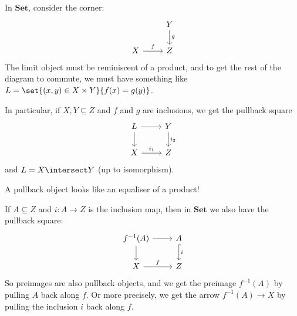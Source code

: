 \documentclass[article, a4paper, 11pt, oneside]{memoir}
\numberwithin{equation}{chapter}
\newcommand{\ncat}[1]{\mathbf{#1}} %
\newcommand{\catSet}{\ncat{Set}}
\theoremstyle{myexample}
\theoremstyle{myexamplebreak}
\begin{document}
\begin{examplebreak}
    \begin{enumexample}
        \item In $\catSet$, consider the corner:
        \begin{equation*}
            \begin{tikzcd}
                & Y
                    \ar[d, "g"]
                \\
                X
                    \ar[r, "f"]
                & Z
            \end{tikzcd}
        \end{equation*}
        The limit object must be reminiscent of a product, and to get the rest of the diagram to commute, we must have something like $L = \set{(x,y) \in X \times Y}{f(x) = g(y)}$.

        In particular, if $X, Y \subseteq Z$ and $f$ and $g$ are inclusions, we get the pullback square
        \begin{equation*}
            \begin{tikzcd}
                L
                    \ar[r]
                    \ar[d]
                & Y
                    \ar[d, "i_2"]
                \\
                X
                    \ar[r, "i_1"]
                & Z
            \end{tikzcd}
        \end{equation*}
        and $L = X \intersect Y$ (up to isomorphism).

        A pullback object looks like an equaliser of a product!

        \item If $A \subseteq Z$ and $i \colon A \to Z$ is the inclusion map, then in $\catSet$ we also have the pullback square:
        \begin{equation*}
            \begin{tikzcd}
                f^{-1}(A)
                    \ar[r]
                    \ar[d]
                & A
                    \ar[d, "i", hook]
                \\
                X
                    \ar[r, "f"]
                & Z
            \end{tikzcd}
        \end{equation*}
        So preimages are also pullback objects, and we get the preimage $f^{-1}(A)$ by pulling $A$ back along $f$. Or more precisely, we get the arrow $f^{-1}(A) \to X$ by pulling the inclusion $i$ back along $f$.
    \end{enumexample}
\end{examplebreak}
\end{document}
